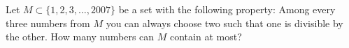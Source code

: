Let $M \subset \{1,2,3,\ldots,2007\}$ be a set with the following property:
Among every three numbers from $M$ you can always choose two such that one is divisible by the other.
How many numbers can $M$ contain at most?
